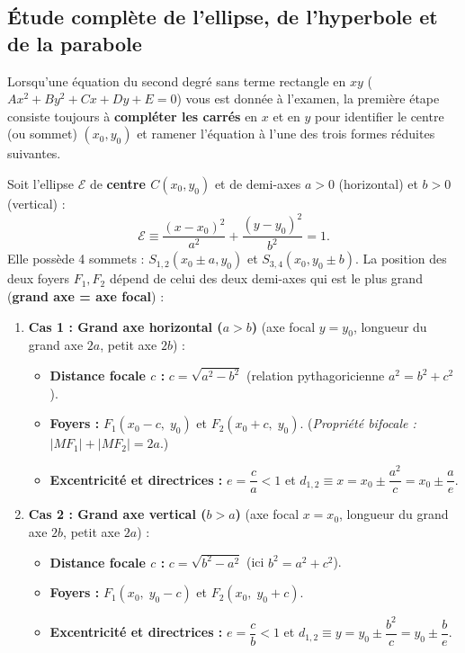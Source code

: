 \subsection{Étude complète de l'ellipse, de l'hyperbole et de la parabole}

Lorsqu'une équation du second degré sans terme rectangle en $xy$ ($Ax^2 + By^2 + Cx + Dy + E = 0$) vous est donnée à l'examen, la première étape consiste toujours à \textbf{compléter les carrés} en $x$ et en $y$ pour identifier le centre (ou sommet) $(x_0, y_0)$ et ramener l'équation à l'une des trois formes réduites suivantes.

\begin{theoreme}
Soit l'ellipse $\mathcal{E}$ de \textbf{centre $C(x_0, y_0)$} et de demi-axes $a > 0$ (horizontal) et $b > 0$ (vertical) :
\[
    \boxed{\mathcal{E} \equiv \frac{(x - x_0)^2}{a^2} + \frac{(y - y_0)^2}{b^2} = 1}.
\]
Elle possède 4 sommets : $S_{1,2}(x_0 \pm a, y_0)$ et $S_{3,4}(x_0, y_0 \pm b)$. La position des deux foyers $F_1, F_2$ dépend de celui des deux demi-axes qui est le plus grand (\textbf{grand axe = axe focal}) :
\begin{enumerate}
    \item \textbf{Cas 1 : Grand axe horizontal ($a > b$)} (axe focal $y = y_0$, longueur du grand axe $2a$, petit axe $2b$) :
    \begin{itemize}
        \item \textbf{Distance focale $c$ :} $\boxed{c = \sqrt{a^2 - b^2}}$ \quad (relation pythagoricienne $a^2 = b^2 + c^2$).
        \item \textbf{Foyers :} $F_1(x_0 - c,\; y_0)$ et $F_2(x_0 + c,\; y_0)$. \quad (\emph{Propriété bifocale :} $|MF_1| + |MF_2| = 2a$.)
        \item \textbf{Excentricité et directrices :} $e = \dfrac{c}{a} < 1$ \quad et \quad $d_{1,2} \equiv x = x_0 \pm \dfrac{a^2}{c} = x_0 \pm \dfrac{a}{e}$.
    \end{itemize}
    \item \textbf{Cas 2 : Grand axe vertical ($b > a$)} (axe focal $x = x_0$, longueur du grand axe $2b$, petit axe $2a$) :
    \begin{itemize}
        \item \textbf{Distance focale $c$ :} $\boxed{c = \sqrt{b^2 - a^2}}$ \quad (ici $b^2 = a^2 + c^2$).
        \item \textbf{Foyers :} $F_1(x_0,\; y_0 - c)$ et $F_2(x_0,\; y_0 + c)$.
        \item \textbf{Excentricité et directrices :} $e = \dfrac{c}{b} < 1$ \quad et \quad $d_{1,2} \equiv y = y_0 \pm \dfrac{b^2}{c} = y_0 \pm \dfrac{b}{e}$.
    \end{itemize}
\end{enumerate}
\end{theoreme}

